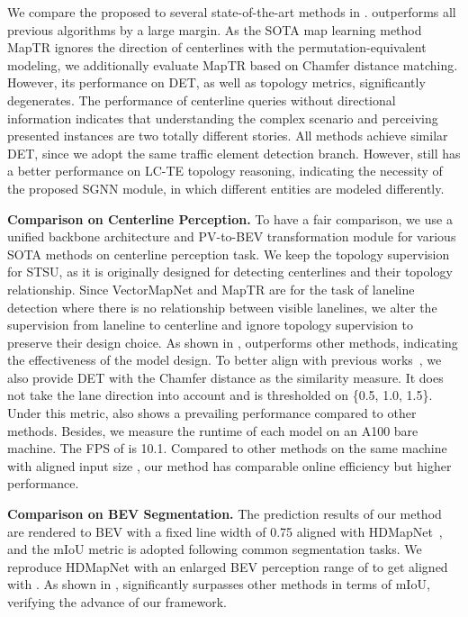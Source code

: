 We compare the proposed \algname to several state-of-the-art methods in . 
\algname outperforms all previous algorithms by a large margin.
As the SOTA map learning method MapTR ignores the direction of centerlines with the permutation-equivalent modeling, we additionally evaluate MapTR based on Chamfer distance matching. 
However, its performance on DET, as well as topology metrics, significantly degenerates. 
The performance of centerline queries without directional information indicates that understanding the complex scenario and perceiving presented instances are two totally different stories.
All methods achieve similar DET, since we adopt the same traffic element detection branch.
However, \algname still has a better performance on LC-TE topology reasoning, indicating the necessity of the proposed SGNN module, in which different entities are modeled differently.


\smallskip
\noindent
\textbf{Comparison on Centerline Perception.} 
To have a fair comparison, we use a unified backbone architecture and PV-to-BEV transformation module for various SOTA methods on centerline perception task.
We keep the topology supervision for STSU, as it is originally designed for detecting centerlines and their topology relationship.
Since VectorMapNet and MapTR are for the task of laneline detection where there is no relationship between visible lanelines, we alter the supervision from laneline to centerline and ignore topology supervision to preserve their design choice.
As shown in , \algname outperforms other methods, indicating the effectiveness of the model design.
To better align with previous works~\cite{liu2022vectormapnet, liao2023maptr}, we also provide DET with the Chamfer distance as the similarity measure.
It does not take the lane direction into account and is thresholded on \{0.5, 1.0, 1.5\}.
Under this metric, \algname also shows a prevailing performance compared to other methods.
Besides, we measure the runtime of each model on an A100 bare machine.
The FPS of \algname is 10.1. Compared to other methods on the same machine with aligned input size , our method has comparable online efficiency but higher performance.


\smallskip
\noindent
\textbf{Comparison on BEV Segmentation.} 
The prediction results of our method are rendered to BEV with a fixed line width of 0.75 aligned with HDMapNet~\cite{li2021hdmapnet}, and the mIoU metric is adopted following common segmentation tasks. 
We reproduce HDMapNet with an enlarged BEV perception range of  to get aligned with \algname.
As shown in , \algname significantly surpasses other methods in terms of mIoU, verifying the advance of our framework.



